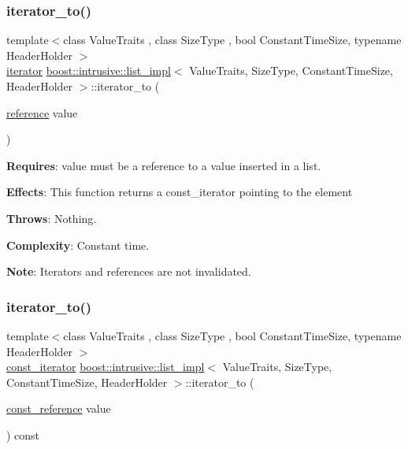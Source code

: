 \subsubsection{\texorpdfstring{iterator\+\_\+to()}{iterator\_to()}\hspace{0.1cm}{\footnotesize\ttfamily [1/2]}}
{\footnotesize\ttfamily template$<$class Value\+Traits , class Size\+Type , bool Constant\+Time\+Size, typename Header\+Holder $>$ \\
\hyperlink{classboost_1_1intrusive_1_1list__impl_a15c0189bf62eb9fb98bc07ef10b8cb23}{iterator} \hyperlink{classboost_1_1intrusive_1_1list__impl}{boost\+::intrusive\+::list\+\_\+impl}$<$ Value\+Traits, Size\+Type, Constant\+Time\+Size, Header\+Holder $>$\+::iterator\+\_\+to (\begin{DoxyParamCaption}\item[{\hyperlink{classboost_1_1intrusive_1_1list__impl_a881763b587dbe7c0237a552a9e89755a}{reference}}]{value }\end{DoxyParamCaption})\hspace{0.3cm}{\ttfamily [inline]}}

{\bfseries Requires}\+: value must be a reference to a value inserted in a list.

{\bfseries Effects}\+: This function returns a const\+\_\+iterator pointing to the element

{\bfseries Throws}\+: Nothing.

{\bfseries Complexity}\+: Constant time.

{\bfseries Note}\+: Iterators and references are not invalidated. \mbox{\label{classboost_1_1intrusive_1_1list__impl_a67a906c22bb2ca0a9ddfc60224f5d8ba}} 
\subsubsection{\texorpdfstring{iterator\+\_\+to()}{iterator\_to()}\hspace{0.1cm}{\footnotesize\ttfamily [2/2]}}
{\footnotesize\ttfamily template$<$class Value\+Traits , class Size\+Type , bool Constant\+Time\+Size, typename Header\+Holder $>$ \\
\hyperlink{classboost_1_1intrusive_1_1list__impl_af4ced710fe02662c5650d161af83d8cd}{const\+\_\+iterator} \hyperlink{classboost_1_1intrusive_1_1list__impl}{boost\+::intrusive\+::list\+\_\+impl}$<$ Value\+Traits, Size\+Type, Constant\+Time\+Size, Header\+Holder $>$\+::iterator\+\_\+to (\begin{DoxyParamCaption}\item[{\hyperlink{classboost_1_1intrusive_1_1list__impl_a3d37629151c76fb8389ac3ba3b359201}{const\+\_\+reference}}]{value }\end{DoxyParamCaption}) const\hspace{0.3cm}{\ttfamily [inline]}}

